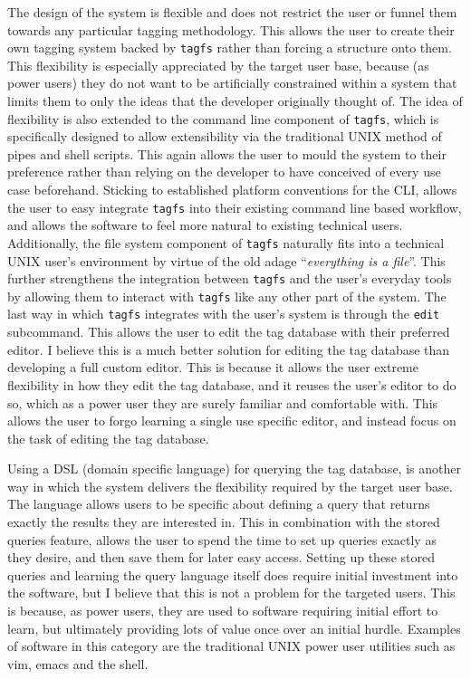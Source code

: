 The design of the system is flexible and does not restrict the user or funnel
them towards any particular tagging methodology. This allows the user to create
their own tagging system backed by \texttt{tagfs} rather than forcing a
structure onto them. This flexibility is especially appreciated by the target
user base, because (as power users) they do not want to be artificially
constrained within a system that limits them to only the ideas that the
developer originally thought of. The idea of flexibility is also extended to
the command line component of \texttt{tagfs}, which is specifically designed to
allow extensibility via the traditional UNIX method of pipes and shell scripts.
This again allows the user to mould the system to their preference rather than
relying on the developer to have conceived of every use case beforehand.
Sticking to established platform conventions for the CLI, allows the user to
easy integrate \texttt{tagfs} into their existing command line based workflow,
and allows the software to feel more natural to existing technical users.
Additionally, the file system component of \texttt{tagfs} naturally fits into a
technical UNIX user's environment by virtue of the old adage ``\emph{everything
is a file}''. This further strengthens the integration between \texttt{tagfs}
and the user's everyday tools by allowing them to interact with \texttt{tagfs}
like any other part of the system. The last way in which \texttt{tagfs}
integrates with the user's system is through the \texttt{edit} subcommand. This
allows the user to edit the tag database with their preferred editor. I believe
this is a much better solution for editing the tag database than developing a
full custom editor. This is because it allows the user extreme flexibility in
how they edit the tag database, and it reuses the user's editor to do so, which
as a power user they are surely familiar and comfortable with. This allows the
user to forgo learning a single use specific editor, and instead focus on the
task of editing the tag database.

Using a DSL (domain specific language) for querying the tag database, is
another way in which the system delivers the flexibility required by the target
user base. The language allows users to be specific about defining a query that
returns exactly the results they are interested in. This in combination with
the stored queries feature, allows the user to spend the time to set up queries
exactly as they desire, and then save them for later easy access. Setting up
these stored queries and learning the query language itself does require
initial investment into the software, but I believe that this is not a problem
for the targeted users. This is because, as power users, they are used to
software requiring initial effort to learn, but ultimately providing lots of
value once over an initial hurdle. Examples of software in this category are
the traditional UNIX power user utilities such as vim, emacs and the shell.

